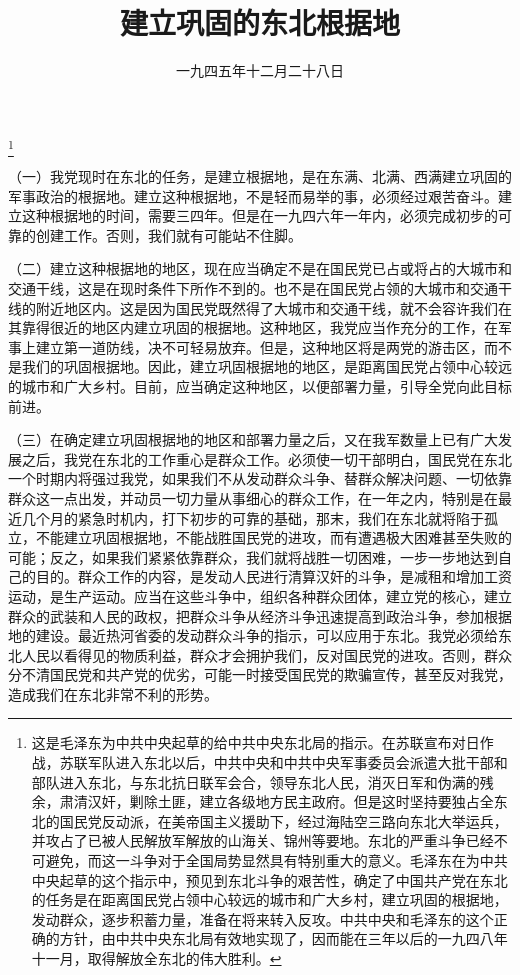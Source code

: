 
\title{建立巩固的东北根据地}
\date{一九四五年十二月二十八日}
\thanks{这是毛泽东为中共中央起草的给中共中央东北局的指示。在苏联宣布对日作战，苏联军队进入东北以后，中共中央和中共中央军事委员会派遣大批干部和部队进入东北，与东北抗日联军会合，领导东北人民，消灭日军和伪满的残余，肃清汉奸，剿除土匪，建立各级地方民主政府。但是这时坚持要独占全东北的国民党反动派，在美帝国主义援助下，经过海陆空三路向东北大举运兵，并攻占了已被人民解放军解放的山海关、锦州等要地。东北的严重斗争已经不可避免，而这一斗争对于全国局势显然具有特别重大的意义。毛泽东在为中共中央起草的这个指示中，预见到东北斗争的艰苦性，确定了中国共产党在东北的任务是在距离国民党占领中心较远的城市和广大乡村，建立巩固的根据地，发动群众，逐步积蓄力量，准备在将来转入反攻。中共中央和毛泽东的这个正确的方针，由中共中央东北局有效地实现了，因而能在三年以后的一九四八年十一月，取得解放全东北的伟大胜利。}
\maketitle


（一）我党现时在东北的任务，是建立根据地，是在东满、北满、西满建立巩固的军事政治的根据地。建立这种根据地，不是轻而易举的事，必须经过艰苦奋斗。建立这种根据地的时间，需要三四年。但是在一九四六年一年内，必须完成初步的可靠的创建工作。否则，我们就有可能站不住脚。

（二）建立这种根据地的地区，现在应当确定不是在国民党已占或将占的大城市和交通干线，这是在现时条件下所作不到的。也不是在国民党占领的大城市和交通干线的附近地区内。这是因为国民党既然得了大城市和交通干线，就不会容许我们在其靠得很近的地区内建立巩固的根据地。这种地区，我党应当作充分的工作，在军事上建立第一道防线，决不可轻易放弃。但是，这种地区将是两党的游击区，而不是我们的巩固根据地。因此，建立巩固根据地的地区，是距离国民党占领中心较远的城市和广大乡村。目前，应当确定这种地区，以便部署力量，引导全党向此目标前进。

（三）在确定建立巩固根据地的地区和部署力量之后，又在我军数量上已有广大发展之后，我党在东北的工作重心是群众工作。必须使一切干部明白，国民党在东北一个时期内将强过我党，如果我们不从发动群众斗争、替群众解决问题、一切依靠群众这一点出发，并动员一切力量从事细心的群众工作，在一年之内，特别是在最近几个月的紧急时机内，打下初步的可靠的基础，那末，我们在东北就将陷于孤立，不能建立巩固根据地，不能战胜国民党的进攻，而有遭遇极大困难甚至失败的可能；反之，如果我们紧紧依靠群众，我们就将战胜一切困难，一步一步地达到自己的目的。群众工作的内容，是发动人民进行清算汉奸的斗争，是减租和增加工资运动，是生产运动。应当在这些斗争中，组织各种群众团体，建立党的核心，建立群众的武装和人民的政权，把群众斗争从经济斗争迅速提高到政治斗争，参加根据地的建设。最近热河省委的发动群众斗争的指示，可以应用于东北。我党必须给东北人民以看得见的物质利益，群众才会拥护我们，反对国民党的进攻。否则，群众分不清国民党和共产党的优劣，可能一时接受国民党的欺骗宣传，甚至反对我党，造成我们在东北非常不利的形势。

